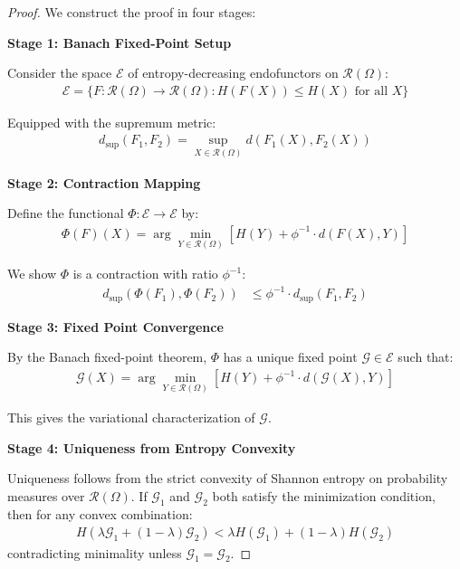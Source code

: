 \begin{proof}
We construct the proof in four stages:

\textbf{Stage 1: Banach Fixed-Point Setup}

Consider the space $\mathcal{E}$ of entropy-decreasing endofunctors on $\mathcal{R}(\Omega)$:
\begin{align}
\mathcal{E} = \{F: \mathcal{R}(\Omega) \to \mathcal{R}(\Omega) : H(F(X)) \leq H(X) \text{ for all } X\}
\end{align}

Equipped with the supremum metric:
\begin{align}
d_{\sup}(F_1, F_2) = \sup_{X \in \mathcal{R}(\Omega)} d(F_1(X), F_2(X))
\end{align}

\textbf{Stage 2: Contraction Mapping}

Define the functional $\Phi: \mathcal{E} \to \mathcal{E}$ by:
\begin{align}
\Phi(F)(X) = \arg\min_{Y \in \mathcal{R}(\Omega)} \left[H(Y) + \phi^{-1} \cdot d(F(X), Y)\right]
\end{align}

We show $\Phi$ is a contraction with ratio $\phi^{-1}$:
\begin{align}
d_{\sup}(\Phi(F_1), \Phi(F_2)) &\leq \phi^{-1} \cdot d_{\sup}(F_1, F_2)
\end{align}

\textbf{Stage 3: Fixed Point Convergence}

By the Banach fixed-point theorem, $\Phi$ has a unique fixed point $\mathcal{G} \in \mathcal{E}$ such that:
\begin{align}
\mathcal{G}(X) = \arg\min_{Y \in \mathcal{R}(\Omega)} \left[H(Y) + \phi^{-1} \cdot d(\mathcal{G}(X), Y)\right]
\end{align}

This gives the variational characterization of $\mathcal{G}$.

\textbf{Stage 4: Uniqueness from Entropy Convexity}

Uniqueness follows from the strict convexity of Shannon entropy on probability measures over $\mathcal{R}(\Omega)$. If $\mathcal{G}_1$ and $\mathcal{G}_2$ both satisfy the minimization condition, then for any convex combination:
\begin{align}
H(\lambda \mathcal{G}_1 + (1-\lambda)\mathcal{G}_2) < \lambda H(\mathcal{G}_1) + (1-\lambda)H(\mathcal{G}_2)
\end{align}
contradicting minimality unless $\mathcal{G}_1 = \mathcal{G}_2$.
\end{proof}

